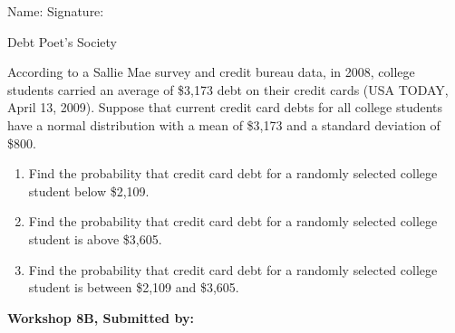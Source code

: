 \documentclass[11pt]{book}\usepackage[]{graphicx}\usepackage[]{color}
\begin{document}
\begin{exercises}
\begin{exercise}
\begin{center}
{{\vspace{4mm}
Name: \underline{\phantom{xxxxxxxxxxxxxxxxxxxxxxxx}} Signature: \underline{\phantom{xxxxxxxxxxxxxxxxxxxxxxxx}}
 }}
\end{center}

Debt Poet's Society

According to a Sallie Mae survey and credit bureau data, in 2008, college students carried an average of \$3,173 debt on their credit cards (USA TODAY, April 13, 2009). Suppose that current credit card debts for all college students have a normal distribution with a mean of \$3,173 and a standard deviation of \$800.

\begin{enumerate}
  \item Find the probability that credit card debt for a randomly selected college student below \$2,109.
  \item Find the probability that credit card debt for a randomly selected college student is above \$3,605.
  \item Find the probability that credit card debt for a randomly selected college student is between \$2,109 and \$3,605.
\end{enumerate}

\end{exercise}
\begin{solution}  %

\end{solution}

\clearpage

    \begin{exercise}  %

    \begin{center}
\begin{flushleft}\textbf{\large \hfill Workshop 8B, Submitted by: }\end{flushleft}

\end{center}
\end{exercise}
\end{exercises}
\end{document}

